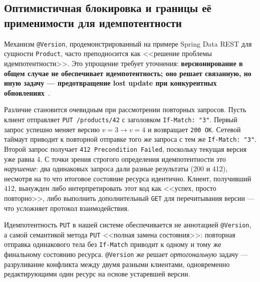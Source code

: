 \subsection{Оптимистичная блокировка и границы её применимости для идемпотентности}
\label{subsec:versioning-limits}

Механизм \texttt{@Version}, продемонстрированный на примере Spring Data REST для сущности \texttt{Product}, часто преподносится как <<решение проблемы идемпотентности>>. Это упрощение требует уточнения: \textbf{версионирование в общем случае не обеспечивает идемпотентность; оно решает связанную, но иную задачу --- предотвращение lost update при конкурентных обновлениях}~\cite{fowler2002patterns, kleppmann2017designing}.

Различие становится очевидным при рассмотрении повторных запросов. Пусть клиент отправляет \texttt{PUT /products/42} с заголовком \texttt{If-Match: "3"}. Первый запрос успешно меняет версию $v = 3 \to v = 4$ и возвращает \texttt{200 OK}. Сетевой таймаут приводит к повторной отправке того же запроса с тем же \texttt{If-Match: "3"}. Второй запрос получает \texttt{412 Precondition Failed}, поскольку текущая версия уже равна 4. С точки зрения строгого определения идемпотентности это \emph{нарушение}: два одинаковых запроса дали разные результаты (200 и 412), несмотря на то что итоговое состояние ресурса идентично. Клиент, получивший 412, вынужден либо интерпретировать этот код как <<успех, просто повторно>>, либо выполнить дополнительный \texttt{GET} для перечитывания версии --- что усложняет протокол взаимодействия.

Идемпотентность \texttt{PUT} в нашей системе обеспечивается не аннотацией \texttt{@Version}, а самой семантикой метода \texttt{PUT} <<полная замена состояния>>: повторная отправка одинакового тела без \texttt{If-Match} приводит к одному и тому же финальному состоянию ресурса. \texttt{@Version} же решает \emph{ортогональную} задачу --- разруливание конфликта между двумя разными клиентами, одновременно редактирующими один ресурс на основе устаревшей версии.

